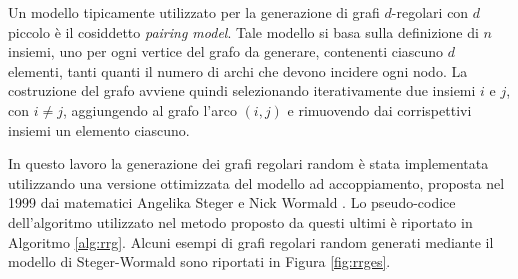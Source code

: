 Un modello tipicamente utilizzato per la generazione di grafi $d$-regolari con $d$ piccolo è il cosiddetto \textit{pairing model}. Tale modello si basa sulla definizione di $n$ insiemi, uno per ogni vertice del grafo da generare, contenenti ciascuno $d$ elementi, tanti quanti il numero di archi che devono incidere ogni nodo. La costruzione del grafo avviene quindi selezionando iterativamente due insiemi $i$ e $j$, con $i \neq j$, aggiungendo al grafo l'arco $(i,j)$ e rimuovendo dai corrispettivi insiemi un elemento ciascuno. 

In questo lavoro la generazione dei grafi regolari random è stata implementata utilizzando una versione ottimizzata del modello ad accoppiamento, proposta nel 1999 dai matematici Angelika Steger e Nick Wormald \cite{steger_wormald_1999}. Lo pseudo-codice dell'algoritmo utilizzato nel metodo proposto da questi ultimi è riportato in Algoritmo \ref{alg:rrg}. Alcuni esempi di grafi regolari random generati mediante il modello di Steger-Wormald sono riportati in Figura \ref{fig:rrges}.

